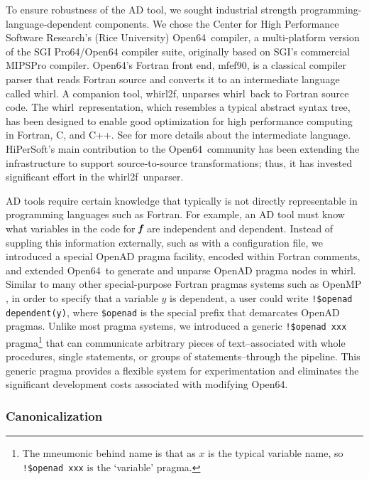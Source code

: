 \documentclass[11pt]{article}
\newcommand{\mfefninety}{mfef90}
\newcommand{\OpenSixtyFour}{Open64}
\newcommand{\whirl}{whirl}
\newcommand{\whirlTof}{whirl2f}
\newcommand{\bmf}{\mbox{\bf\em f}}
\newcommand{\code}[1]{{\small\tt{#1}}}
\begin{document}
To ensure robustness of the AD tool, we sought industrial strength
programming-language-dependent components.  We chose the Center for
High Performance Software Research's (Rice University) \OpenSixtyFour\
compiler, a multi-platform version of the SGI Pro64/Open64 compiler
suite, originally based on SGI's commercial MIPSPro compiler.
\OpenSixtyFour's Fortran front end, \mfefninety, is a classical
compiler parser that reads Fortran source and converts it to an
intermediate language called \whirl.  A companion tool, \whirlTof,
unparses \whirl\ back to Fortran source code.  The \whirl\
representation, which resembles a typical abstract syntax tree, has
been designed to enable good optimization for high performance
computing in Fortran, C, and C++. See \cite{open64Web} for more
details about the intermediate language.  HiPerSoft's main
contribution to the \OpenSixtyFour\ community has been extending the
infrastructure to support source-to-source transformations; thus, it
has invested significant effort in the \whirlTof\ unparser.

AD tools require certain knowledge that typically is not directly
representable in programming languages such as Fortran.  For example,
an AD tool must know what variables in the code for $\bmf$ are
independent and dependent.  Instead of suppling this information
externally, such as with a configuration file, we introduced a special
OpenAD pragma facility, encoded within Fortran comments, and extended
\OpenSixtyFour\ to generate and unparse OpenAD pragma nodes in \whirl.
Similar to many other special-purpose Fortran pragmas systems such as
OpenMP \cite{OpenMP-website}, in order to specify that a variable
$y$ is dependent, a user could write \code{!\$openad dependent(y)},
where \code{\$openad} is the special prefix that demarcates OpenAD
pragmas.  Unlike most pragma systems, we introduced a generic
\code{!\$openad xxx} pragma\footnote{The mneumonic behind name is that
  as $x$ is the typical variable name, so \code{!\$openad xxx} is the
  `variable' pragma.} that can communicate arbitrary pieces of
text--associated with whole procedures, single statements, or groups
of statements--through the pipeline.  This generic pragma provides a
flexible system for experimentation and eliminates the significant
development costs associated with modifying \OpenSixtyFour.


\subsubsection{Canonicalization}\label{sssec:Canonicalization}
\end{document}
